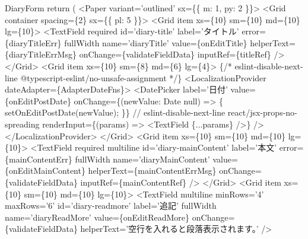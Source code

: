 \begin{starterprogram}[]{DiaryForm}
{    return (
      \textless{}Paper variant='outlined' sx=\{\{ m: 1, py: 2 \}\}\textgreater{}
        \textless{}Grid container spacing=\{2\} sx=\{\{ pl: 5 \}\}\textgreater{}
          \textless{}Grid item xs=\{10\} sm=\{10\} md=\{10\} lg=\{10\}\textgreater{}
            \textless{}TextField
              required
              id='diary{-}title'
              label='タイトル'
              error=\{diaryTitleErr\}
              fullWidth
              name='diaryTitle'
              value=\{onEditTitle\}
              helperText=\{diaryTitleErrMsg\}
              onChange=\{validateFieldData\}
              inputRef=\{titleRef\}
            /\textgreater{}
          \textless{}/Grid\textgreater{}
          \textless{}Grid item xs=\{10\} sm=\{8\} md=\{6\} lg=\{4\}\textgreater{}
            \{/* eslint{-}disable{-}next{-}line @typescript{-}eslint/no{-}unsafe{-}assignment */\}
            \textless{}LocalizationProvider dateAdapter=\{AdapterDateFns\}\textgreater{}
              \textless{}DatePicker
                label='日付'
                value=\{onEditPostDate\}
                onChange=\{(newValue: Date \textbar{} null) =\textgreater{} \{
                  setOnEditPostDate(newValue);
                \}\}
                // eslint{-}disable{-}next{-}line react/jsx{-}props{-}no{-}spreading
                renderInput=\{(params) =\textgreater{} \textless{}TextField \{...params\} /\textgreater{}\}
              /\textgreater{}
            \textless{}/LocalizationProvider\textgreater{}
          \textless{}/Grid\textgreater{}
          \textless{}Grid item xs=\{10\} sm=\{10\} md=\{10\} lg=\{10\}\textgreater{}
            \textless{}TextField
              required
              multiline
              id='diary{-}mainContent'
              label='本文'
              error=\{mainContentErr\}
              fullWidth
              name='diaryMainContent'
              value=\{onEditMainContent\}
              helperText=\{mainContentErrMsg\}
              onChange=\{validateFieldData\}
              inputRef=\{mainContentRef\}
            /\textgreater{}
          \textless{}/Grid\textgreater{}
          \textless{}Grid item xs=\{10\} sm=\{10\} md=\{10\} lg=\{10\}\textgreater{}
            \textless{}TextField
              multiline
              minRows='4'
              maxRows='6'
              id='diary{-}readmore'
              label='追記'
              fullWidth
              name='diaryReadMore'
              value=\{onEditReadMore\}
              onChange=\{validateFieldData\}
              helperText='空行を入れると段落表示されます。'
            /\textgreater{}
}
\end{starterprogram}
